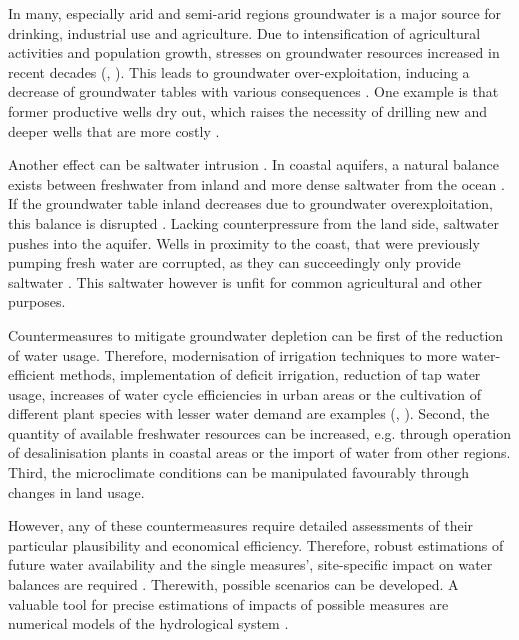 In many, especially arid and semi-arid regions groundwater is a major source for drinking, industrial use and agriculture. Due to intensification of agricultural activities and population growth, stresses on groundwater resources increased in recent decades (\textcite{Choukr.2017}, \textcite{ElRawy.2022}). This leads to groundwater over-exploitation, inducing a decrease of groundwater tables with various consequences \parencite{Hssaisoune.2017}. One example is that former productive wells dry out, which raises the necessity of drilling new and deeper wells that are more costly \parencite{English.1990}. 

Another effect can be saltwater intrusion \parencite{Fetter.2001}. In coastal aquifers, a natural balance exists between freshwater from inland and more dense saltwater from the ocean \parencite{Mays.2005}. If the groundwater table inland decreases due to groundwater overexploitation, this balance is disrupted \parencite{Fetter.2001}. Lacking counterpressure from the land side, saltwater pushes into the aquifer. Wells in proximity to the coast, that were previously pumping fresh water are corrupted, as they can succeedingly only provide saltwater \parencite{Fetter.2001}. This saltwater however is unfit for common agricultural \parencite{Taiz.2015} and other purposes.

Countermeasures to mitigate groundwater depletion can be first of the reduction of water usage. Therefore, modernisation of irrigation techniques to more water-efficient methods, implementation of deficit irrigation, reduction of tap water usage, increases of water cycle efficiencies in urban areas or the cultivation of different plant species with lesser water demand are examples (\textcite{English.1990}, \textcite{Schuetze.2012}). Second, the quantity of available freshwater resources can be increased, e.g. through operation of desalinisation plants in coastal areas or the import of water from other regions. Third, the microclimate conditions can be manipulated favourably through changes in land usage.

However, any of these countermeasures require detailed assessments of their particular plausibility and economical efficiency. Therefore, robust estimations of future water availability and the single measures', site-specific impact on water balances are required \parencite{ElRawy.2022}. Therewith, possible scenarios can be developed. A valuable tool for precise estimations of impacts of possible measures are numerical models of the hydrological system \parencite{ElRawy.2022}.

